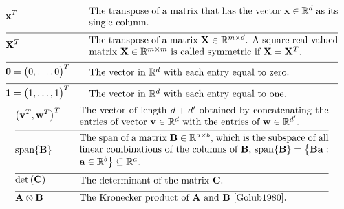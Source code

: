 \begin{align}
	&\featurevec^{T} &\quad & \parbox{.75\textwidth}{The transpose of a matrix that has the vector 
		$\featurevec \in \mathbb{R}^{\dimlocalmodel}$ as its single column.} \nonumber \\[2mm] \hline \nonumber\\[-5mm]
	&\mathbf{X}^{T} &\quad & \parbox{.75\textwidth}{The transpose of a matrix $\mathbf{X} \in \mathbb{R}^{\samplesize \times \featurelen}$. 
		A square real-valued matrix $\mathbf{X} \in \mathbb{R}^{\samplesize \times \samplesize}$ 
		is called symmetric if $\mathbf{X} = \mathbf{X}^{T}$. }  \nonumber \\[2mm] \hline \nonumber\\[-5mm]
	&\mathbf{0}= \big(0,\ldots,0\big)^{T}  & \quad &  \parbox{.75\textwidth}{The vector in $\mathbb{R}^{\dimlocalmodel}$ with each entry equal to zero.} \nonumber \\[2mm] \hline \nonumber\\[-5mm]
	&\mathbf{1}= \big(1,\ldots,1\big)^{T}  & \quad &  \parbox{.75\textwidth}{The vector in $\mathbb{R}^{\dimlocalmodel}$ with each entry equal to one.} \nonumber
\end{align} 
\newpage
\begin{align} 
	&\big(\vv^{T},\vw^{T} \big)^{T}  & \quad &  \parbox{.75\textwidth}{The vector of length $\featurelen+\featurelen'$ 
		obtained by concatenating the entries of vector $\vv \in \mathbb{R}^{\featurelen}$ with the entries of $\vw \in \mathbb{R}^{\featurelen'}$.} \nonumber \nonumber \\[2mm] \hline \nonumber\\[-5mm]
	&	{\rm span}\{ \mathbf{B} \}  & \quad &  \parbox{.75\textwidth}{The span of a matrix $\mathbf{B} \in \mathbb{R}^{a \times b}$, 
		which is the subspace of all linear combinations of the columns of $\mathbf{B}$, 
		${\rm span}\{ \mathbf{B} \} = \big\{  \mathbf{B} \va : \va \in \mathbb{R}^{b} \big\} \subseteq \mathbb{R}^{a}$.}\nonumber \\[2mm] \hline \nonumber\\[-5mm]
	&\determinant{\mC} &\quad & \parbox{.75\textwidth}{The determinant of the matrix $\mC$. } \nonumber \\[2mm] \hline \nonumber\\[-5mm]
	&\mathbf{A} \otimes \mathbf{B} &\quad & \parbox{.75\textwidth}{The Kronecker product of $\mathbf{A}$ and $\mathbf{B}$ \cite{Golub1980}. }  \nonumber
\end{align} 

\newpage

